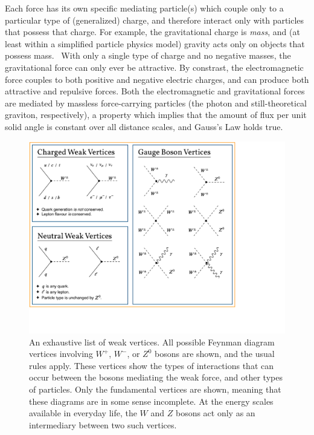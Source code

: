 %
Each force has its own specific mediating particle(s) which couple only to a particular type of (generalized) charge, and therefore interact only with particles that possess that charge.  For example, the gravitational charge is \emph{mass}, and (at least within a simplified particle physics model) gravity acts only on objects that possess mass.~  With only a single type of charge and no negative masses, the gravitational force can only ever be attractive.
%
By constrast, the electromagnetic force couples to both positive and negative electric charges, and can produce both attractive and repulsive forces.  Both the electromagnetic and gravitational forces are mediated by massless force-carrying particles (the photon and still-theoretical graviton, respectively), a property which implies that the amount of flux per unit solid angle is constant over all distance scales, and Gauss's Law holds true.

\begin{figure}[h!t!b!]
	\centering
	\includegraphics[width=1.0\linewidth]{Figures/VertexFeynmanDiagrams.pdf}
	\caption[An exhaustive list of weak vertices]{An exhaustive list of weak vertices.  All possible Feynman diagram vertices involving $W^+$, $W^-$, or $Z^0$ bosons are shown, and the usual rules apply.  These vertices show the types of interactions that can occur between the bosons mediating the weak force, and other types of particles.  Only the fundamental vertices are shown, meaning that these diagrams are in some sense incomplete.  At the energy scales available in everyday life, the $W$ and $Z$ bosons act only as an intermediary between two such vertices.}	
	\label{fig:feynmandiagrams_general}
\end{figure}

